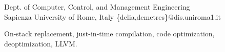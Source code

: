 \documentclass[10pt]{sigplanconf}
\begin{document}
\setlength{\pdfpageheight}{\paperheight}
\setlength{\pdfpagewidth}{\paperwidth}

\toappear{}






\newcommand{\anon}{$\bullet\bullet\bullet\bullet\bullet$}

\title{}

           {{\small Dept. of Computer, Control, and Management Engineering\\Sapienza University of Rome, Italy}} %
           {\{delia,demetres\}@dis.uniroma1.it} %

\maketitle

\begin{abstract}

\end{abstract}



\keywords
On-stack replacement, just-in-time compilation, code optimization, deoptimization, LLVM.










\end{document}
